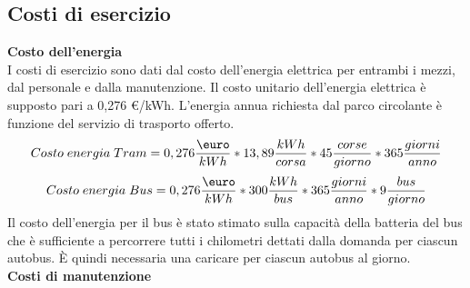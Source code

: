 \documentclass{article}
\begin{document}
\subsection{Costi di esercizio}
\textbf{Costo dell'energia}\\

I costi di esercizio sono dati dal costo dell’energia elettrica per entrambi i mezzi, dal personale e dalla manutenzione.
Il costo unitario dell’energia elettrica è supposto pari a 0,276 \textup{\euro}/kWh. L’energia annua richiesta dal parco circolante è funzione del servizio di trasporto offerto.\\
\begin{equation}
Costo\;energia\; Tram=0,276\frac{\textup{\euro}}{kWh}*13,89\frac{kWh}{corsa}*45\frac{corse}{giorno}*365\frac{giorni}{anno}
\end{equation}
\begin{equation}
Costo\;energia\; Bus=0,276\frac{\textup{\euro}}{kWh}*300\frac{kWh}{bus}*365\frac{giorni}{anno}*9\frac{bus}{giorno}
\end{equation}
Il costo dell’energia per il bus è stato stimato sulla capacità della batteria del bus che è sufficiente a percorrere tutti i chilometri dettati dalla domanda per ciascun autobus. È quindi necessaria una caricare per ciascun autobus al giorno.\\  

\textbf{Costi di manutenzione}\\
\end{document}

